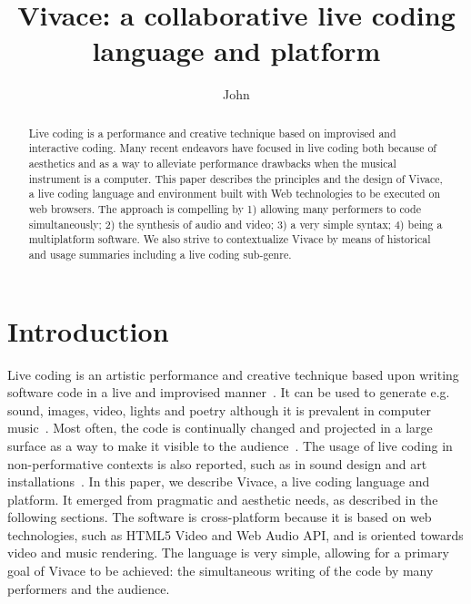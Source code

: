 \documentclass[12pt,times,twocolumn]{article}
\title{Vivace: a collaborative live coding language and platform}
\author{John\inst{1}}
\begin{document}
\maketitle

\begin{abstract}
Live coding is a performance and creative technique based on improvised and interactive coding.
Many recent endeavors have focused in live coding both because of aesthetics
and as a way to alleviate performance drawbacks when the musical instrument is a computer.
This paper describes the principles and the design of Vivace, a live
coding language and environment built with Web technologies to be
executed on web browsers.
The approach is compelling by 1) allowing many performers to code simultaneously;
2) the synthesis of audio and video;
3) a very simple syntax;
4) being a multiplatform software.
We also strive to contextualize Vivace by means
of historical and usage summaries including a live coding sub-genre. 
\end{abstract}

\section{Introduction}
Live coding is an artistic performance and creative technique
based upon writing software code in a live and improvised manner~\cite{nilson2007live}.
It can be used to generate e.g. sound, images, video, lights and poetry
although it is prevalent in computer music~\cite{eff}.
Most often, the code is continually changed and projected in a large surface as a way to
make it visible to the audience~\cite{collins2011live}.
The usage of live coding in non-performative contexts is also reported,
such as in sound design and art installations~\cite{eff}.
In this paper, we describe Vivace, a live coding language and platform.
It emerged from pragmatic and aesthetic needs, as described in the following sections.
The software is cross-platform because it is based on web technologies,
such as HTML5 Video and Web Audio API, and is oriented towards video and music rendering.
The language is very simple, allowing for a primary goal of
Vivace to be achieved: the simultaneous writing of the code by many performers
and the audience.
\end{document}
